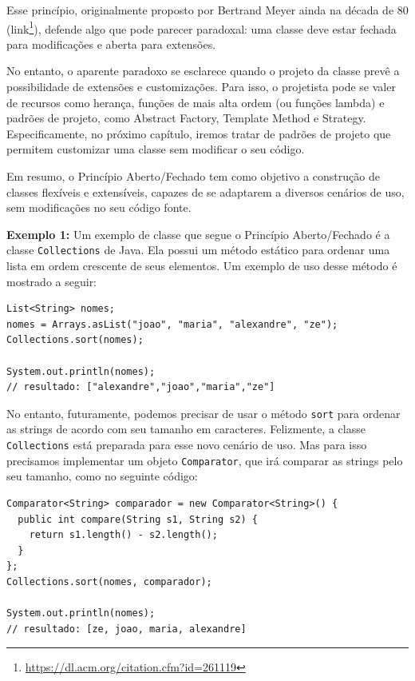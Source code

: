 \documentclass[
  11pt,
  twoside]{book}
\newcommand{\passthrough}[1]{#1}
\DeclareRobustCommand{\href}[2]{#2\footnote{\url{#1}}}
\begin{document}
 

Esse princípio, originalmente proposto por Bertrand Meyer ainda na
década de 80 (\href{https://dl.acm.org/citation.cfm?id=261119}{link}),
defende algo que pode parecer paradoxal: uma classe deve estar fechada
para modificações e aberta para extensões.

No entanto, o aparente paradoxo se esclarece quando o projeto da classe
prevê a possibilidade de extensões e customizações. Para isso, o
projetista pode se valer de recursos como herança, funções de mais alta
ordem (ou funções lambda) e padrões de projeto, como Abstract Factory,
Template Method e Strategy. Especificamente, no próximo capítulo, iremos
tratar de padrões de projeto que permitem customizar uma classe sem
modificar o seu código.

Em resumo, o Princípio Aberto/Fechado tem como objetivo a construção de
classes flexíveis e extensíveis, capazes de se adaptarem a diversos
cenários de uso, sem modificações no seu código fonte.

\textbf{Exemplo 1:} Um exemplo de classe que segue o Princípio
Aberto/Fechado é a classe \passthrough{\lstinline!Collections!} de Java.
Ela possui um método estático para ordenar uma lista em ordem crescente
de seus elementos. Um exemplo de uso desse método é mostrado a seguir:

\begin{lstlisting}
List<String> nomes;
nomes = Arrays.asList("joao", "maria", "alexandre", "ze");
Collections.sort(nomes);

System.out.println(nomes);  
// resultado: ["alexandre","joao","maria","ze"]
\end{lstlisting}

No entanto, futuramente, podemos precisar de usar o método
\passthrough{\lstinline!sort!} para ordenar as strings de acordo com seu
tamanho em caracteres. Felizmente, a classe
\passthrough{\lstinline!Collections!} está preparada para esse novo
cenário de uso. Mas para isso precisamos implementar um objeto
\passthrough{\lstinline!Comparator!}, que irá comparar as strings pelo
seu tamanho, como no seguinte código:

\newpage

\begin{lstlisting}
Comparator<String> comparador = new Comparator<String>() {
  public int compare(String s1, String s2) {
    return s1.length() - s2.length();
  }
};
Collections.sort(nomes, comparador);

System.out.println(nomes);   
// resultado: [ze, joao, maria, alexandre]
\end{lstlisting}
\end{document}
